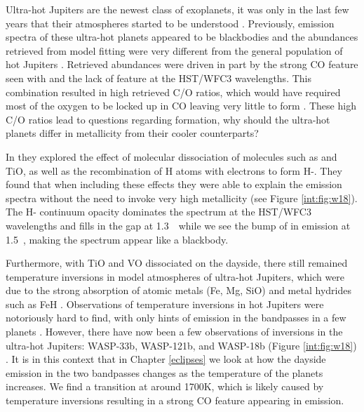 Ultra-hot Jupiters are the newest class of exoplanets, it was only in the last few years that their atmospheres started to be understood \citep[e.g.,][]{Arcangeli2018, Parmentier2018b, Lothringer2018, Kitzmann2018}. Previously, emission spectra of these ultra-hot planets appeared to be blackbodies and the abundances retrieved from model fitting were very different from the general population of hot Jupiters \citep{Stevenson2014b, Haynes2015,Evans2017,Sheppard2017}. Retrieved abundances were driven in part by the strong CO feature seen with \spitzerIRAC and the lack of  feature at the HST/WFC3 wavelengths. This combination resulted in high retrieved C/O ratios, which would have required most of the oxygen to be locked up in CO leaving very little to form . These high C/O ratios lead to questions regarding formation, why should the ultra-hot planets differ in metallicity from their cooler counterparts?

In \citet{Arcangeli2018} they explored the effect of molecular dissociation of molecules such as  and TiO, as well as the recombination of H atoms with electrons to form H-. They found that when including these effects they were able to explain the emission spectra without the need to invoke very high metallicity (see Figure \ref{int:fig:w18}). The H- continuum opacity dominates the spectrum at the HST/WFC3 wavelengths and fills in the gap at 1.3~\um~while we see the bump of  in emission at 1.5~\um, making the spectrum appear like a blackbody.

Furthermore, with TiO and VO dissociated on the dayside, there still remained temperature inversions in model atmospheres of ultra-hot Jupiters, which were due to the strong absorption of atomic metals (Fe, Mg, SiO) and metal hydrides such as FeH \citep{Lothringer2018}. Observations of temperature inversions in hot Jupiters were notoriously hard to find, with only hints of emission in the \spitzer bandpasses in a few planets \citep[e.g.,][]{Nymeyer2011, Deming2012}. However, there have now been a few observations of inversions in the ultra-hot Jupiters: WASP-33b, WASP-121b, and WASP-18b (Figure \ref{int:fig:w18}) \citep{Haynes2015, vonEssen2015, Evans2017, Arcangeli2018, Kreidberg2018b}. It is in this context that in Chapter \ref{eclipses} we look at how the dayside emission in the two \spitzer bandpasses changes as the temperature of the planets increases. We find a transition at around 1700K, which is likely caused by temperature inversions resulting in a strong CO feature appearing in emission.

